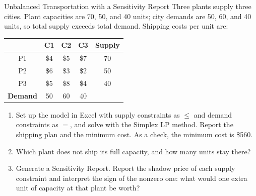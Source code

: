 \begin{ex}{Unbalanced Transportation with a Sensitivity Report}{}
\label{ex:excel-unbalanced-transportation}
 Three plants supply three cities.  Plant capacities are 70, 50, and 40 units; city demands are 50, 60, and 40 units, so total supply exceeds total demand.  Shipping costs per unit are:

\begin{center}
\begin{tabular}{c|c|c|c|c}
 & C1 & C2 & C3 & \textbf{Supply} \\
\hline
P1 & \$4 & \$5 & \$7 & 70 \\
P2 & \$6 & \$3 & \$2 & 50 \\
P3 & \$5 & \$8 & \$4 & 40 \\
\hline
\textbf{Demand} & 50 & 60 & 40 & \\
\end{tabular}
\par{}\label{tab:software-excel-tab05}%

\end{center}

\begin{enumerate}
\item Set up the model in Excel with supply constraints as $\leq$ and demand constraints as $=$, and solve with the Simplex LP method.  Report the shipping plan and the minimum cost.  As a check, the minimum cost is \$560.
\item Which plant does not ship its full capacity, and how many units stay there?
\item Generate a Sensitivity Report.  Report the shadow price of each supply constraint and interpret the sign of the nonzero one: what would one extra unit of capacity at that plant be worth?
\end{enumerate}
\exrefs{\S\ref{sec:excel-solver}, \S\ref{sec:transportation-problem}}
\end{ex}


